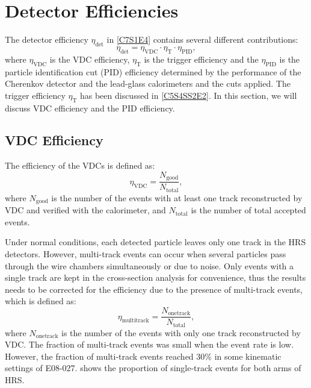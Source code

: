 \section{Detector Efficiencies}
\label{C7S2}

The detector efficiency $\eta_{\mathrm{det}}$ in \cref{C7S1E4} contains several different contributions:
\begin{equation} \label{C7S2E1}
\eta_{\mathrm{det}} = \eta_{\mathrm{VDC}}\cdot\eta_{\mathrm{T}}\cdot\eta_{\mathrm{PID}},
\end{equation}
where $\eta_{\mathrm{VDC}}$ is the VDC efficiency, $\eta_{\mathrm{T}}$ is the trigger efficiency and the $\eta_{\mathrm{PID}}$ is the particle identification cut (PID) efficiency determined by the performance of the Cherenkov detector and the lead-glass calorimeters and the cuts applied. The trigger efficiency $\eta_{\mathrm{T}}$ has been discussed in \cref{C5S4SS2E2}. In this section, we will discuss VDC efficiency and the PID efficiency.

\subsection{VDC Efficiency}
\label{C7S2SS1}

The efficiency of the VDCs is defined as:
\begin{equation} \label{C7S2SS1E1}
\eta_{\mathrm{VDC}} = \frac{N_{\mathrm{good}}}{N_{\mathrm{total}}},
\end{equation}
where $N_{\mathrm{good}}$ is the number of the events with at least one track reconstructed by VDC and verified with the calorimeter, and $N_{\mathrm{total}}$ is the number of total accepted events.

Under normal conditions, each detected particle leaves only one track in the HRS detectors. However, multi-track events can occur when several particles pass through the wire chambers simultaneously or due to noise. Only events with a single track are kept in the cross-section analysis for convenience, thus the results needs to be corrected for the efficiency due to the presence of multi-track events, which is defined as:
\begin{equation} \label{C7S2SS1E2}
\eta_{\mathrm{multitrack}} = \frac{N_{\mathrm{onetrack}}}{N_{\mathrm{total}}},
\end{equation}
where $N_{\mathrm{onetrack}}$ is the number of the events with only one track reconstructed by VDC. The fraction of multi-track events was small when the event rate is low. However, the fraction of multi-track events reached 30\% in some kinematic settings of E08-027.  shows the proportion of single-track events for both arms of HRS.

